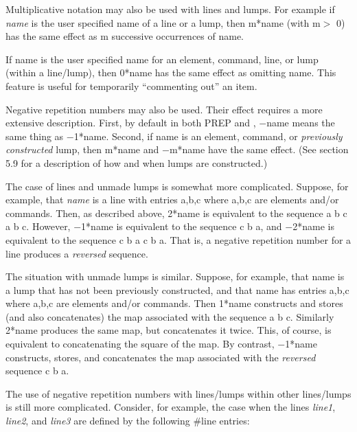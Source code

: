 Multiplicative notation may also be used with lines and lumps. For example
if {\em name} is the user specified name of a line or a lump, then m*name
(with m$>$ 0) has the same effect as m successive occurrences of name.

If name is the user specified name for an element, command, line, or lump
(within a line/lump), then 0*name has the same effect as omitting name.
This feature is useful for temporarily ``commenting out'' an item.

Negative repetition numbers may also be used. Their effect requires a more
extensive description. First, by default in both PREP and \Mary, $-$name
means the same thing as $-$1*name. Second, if name is an element, command,
or {\em previously constructed} lump, then m*name and $-$m*name have the
same effect. (See section 5.9 for a description of how and when lumps are
constructed.)

The case of lines and unmade lumps is somewhat more complicated. Suppose,
for example, that {\em name} is a line with entries a,b,c where a,b,c are
elements and/or commands. Then, as described above, 2*name is equivalent to
the sequence a b c a b c. However, $-$1*name is equivalent to the sequence
c b a, and $-$2*name is equivalent to the sequence c b a c b a. That is, a
negative repetition number for a line produces a {\em reversed} sequence.

The situation with unmade lumps is similar. Suppose, for example, that name
is a lump that has not been previously constructed, and that name has
entries a,b,c where a,b,c are elements and/or commands. Then 1*name
constructs and stores (and also concatenates) the map associated with the
sequence a b c. Similarly 2*name produces the same map, but concatenates it
twice. This, of course, is equivalent to concatenating the square of the
map. By contrast, $-$1*name constructs, stores, and concatenates the map
associated with the {\em reversed} sequence c b a.

The use of negative repetition numbers with lines/lumps within other
lines/lumps is still more complicated. Consider, for example, the case when
the lines {\em line1}, {\em line2}, and {\em line3} are defined by the
following \#line entries:

